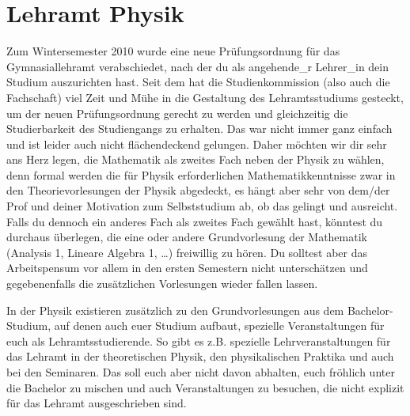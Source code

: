 \section{Lehramt Physik}

Zum Wintersemester 2010 wurde eine neue Prüfungsordnung für das Gymnasiallehramt verabschiedet, nach der du als angehende\_r Lehrer\_in dein Studium auszurichten hast. Seit dem hat die Studienkommission (also auch die Fachschaft) viel Zeit und Mühe in die Gestaltung des Lehramtsstudiums gesteckt, um der neuen Prüfungsordnung gerecht zu werden und gleichzeitig die Studierbarkeit des Studiengangs zu erhalten. Das war nicht immer ganz einfach und ist leider auch nicht flächendeckend gelungen. Daher möchten wir dir sehr ans Herz legen, die Mathematik als zweites Fach neben der Physik zu wählen, denn formal werden die für Physik erforderlichen Mathematikkenntnisse zwar in den Theorievorlesungen der Physik abgedeckt, es hängt aber sehr von dem/der Prof und deiner Motivation zum Selbststudium ab, ob das gelingt und ausreicht. Falls du dennoch ein anderes Fach als zweites Fach gewählt hast, könntest du durchaus überlegen, die eine oder andere Grundvorlesung der Mathematik (Analysis 1, Lineare Algebra 1, \dots) freiwillig zu hören. Du solltest aber das Arbeitspensum vor allem in den ersten Semestern nicht unterschätzen und gegebenenfalls die zusätzlichen Vorlesungen wieder fallen lassen.


In der Physik existieren zusätzlich zu den Grundvorlesungen aus dem Bachelor-Studium, auf denen auch euer Studium aufbaut, spezielle Veranstaltungen für euch als Lehramtsstudierende. So gibt es z.B. spezielle Lehrveranstaltungen für das Lehramt in der theoretischen Physik, den physikalischen Praktika und auch bei den Seminaren. Das soll euch aber nicht davon abhalten, euch fröhlich unter die Bachelor zu mischen und auch Veranstaltungen zu besuchen, die nicht explizit für das Lehramt ausgeschrieben sind.

